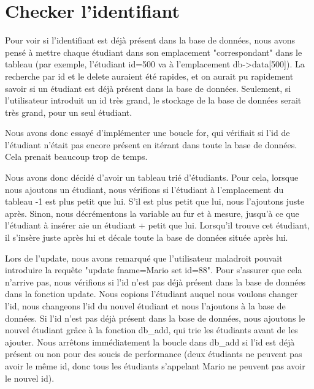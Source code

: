 \documentclass[utf8]{article}
\begin{document}
\section{Checker l'identifiant}
\indent{}
\par
Pour voir si l'identifiant est déjà présent dans la base de données, nous avons pensé à mettre chaque étudiant
dans son emplacement "correspondant" dans le tableau (par exemple, l'étudiant id=500 va à l'emplacement db->data[500]). La recherche par id et le delete auraient été rapides, et on 
aurait pu rapidement savoir si un étudiant est déjà présent dans la base de données.
Seulement, si l'utilisateur introduit un id très grand, le stockage de la base de données serait très grand, pour un seul étudiant.
\par
\indent{}
\par
Nous avons donc essayé d'implémenter une boucle for, qui vérifiait si l'id de l'étudiant n'était pas encore présent en itérant dans toute la base de données.
Cela prenait beaucoup trop de temps. 
\par
\indent{}
\par
Nous avons donc décidé d'avoir un tableau trié d'étudiants. Pour cela, lorsque nous ajoutons un étudiant,
nous vérifions si l'étudiant à l'emplacement du tableau -1 est plus petit que lui. S'il est plus petit que lui, nous l'ajoutons juste après. Sinon, 
nous décrémentons la variable au fur et à mesure, jusqu'à ce que l'étudiant à insérer aie un étudiant + petit que lui. Lorsqu'il trouve cet étudiant, il s'insère juste après lui
et décale toute la base de données située après lui.
\par
\indent{}
\par
Lors de l'update, nous avons remarqué que l'utilisateur maladroit pouvait introduire la requête "update fname=Mario set id=88".
Pour s'assurer que cela n'arrive pas, nous vérifions si l'id n'est pas déjà présent dans la base de données dans la fonction update.
Nous copions l'étudiant auquel nous voulons changer l'id, nous changeons l'id du nouvel étudiant et nous l'ajoutons à la base de données. Si l'id 
n'est pas déjà présent dans la base de données, nous ajoutons le nouvel étudiant grâce à la fonction db\_add, qui trie les étudiants avant de les ajouter.
Nous arrêtons immédiatement la boucle dans db\_add si l'id est déjà présent ou non pour des soucis de performance (deux étudiants ne peuvent pas avoir le même id, 
donc tous les étudiants s'appelant Mario ne peuvent pas avoir le nouvel id). 
\par
\end{document}
